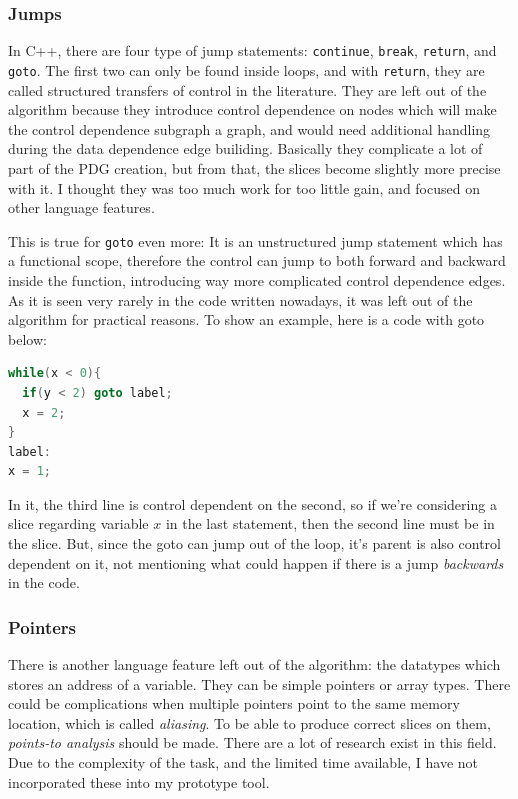 \documentclass[oneside,12pt,a4paper]{book}
\begin{document}
\subsubsection{Jumps}

In C++, there are four type of jump statements: \texttt{continue}, \texttt{break}, \texttt{return}, and \texttt{goto}. The first two can only be found inside loops, and with \texttt{return}, they are called structured transfers of control in the literature. They are left out of the algorithm because they introduce control dependence on nodes which will make the control dependence subgraph a graph, and would need additional handling during the data dependence edge builiding. Basically they complicate a lot of part of the PDG creation, but from that, the slices become slightly more precise with it. I thought they was too much work for too little gain, and focused on other language features.

This is true for \texttt{goto} even more: It is an unstructured jump statement which has a functional scope, therefore the control can jump to both forward and backward inside the function, introducing way more complicated control dependence edges. As it is seen very rarely in the code written nowadays, it was left out of the algorithm for practical reasons. To show an example, here is a code with goto below:

\begin{lstlisting}[language=C++]
while(x < 0){
  if(y < 2) goto label; 
  x = 2;
}
label:
x = 1;
\end{lstlisting}

In it, the third line is control dependent on the second, so if we're considering a slice regarding variable $x$ in the last statement, then the second line must be in the slice. But, since the goto can jump out of the loop, it's parent is also control dependent on it, not mentioning what could happen if there is a jump \textit{backwards} in the code.

\subsubsection{Pointers}

There is another language feature left out of the algorithm: the datatypes which stores an address of a variable. They can be simple pointers or array types. There could be complications when multiple pointers point to the same memory location, which is called \textit{aliasing}. To be able to produce correct slices on them, \textit{points-to analysis} should be made. There are a lot of research exist in this field. Due to the complexity of the task, and the limited time available, I have not incorporated these into my prototype tool.
\end{document}
